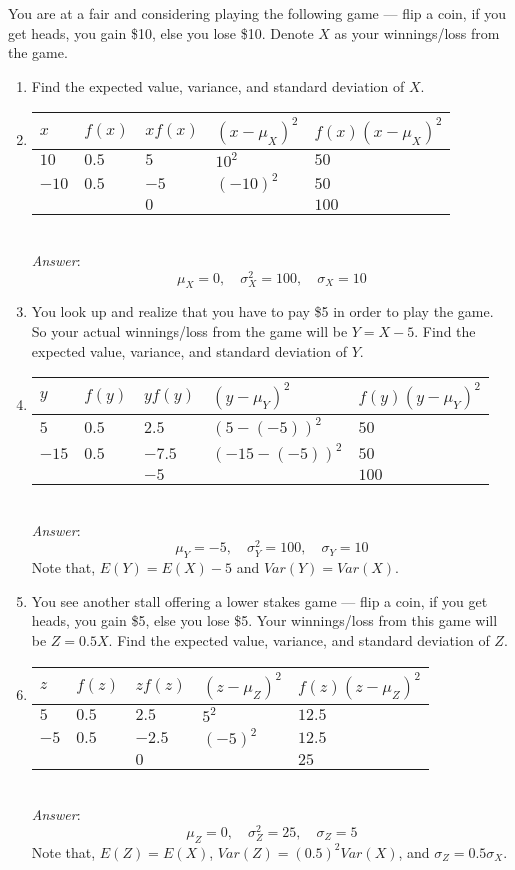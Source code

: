 \documentclass{./../../Latex/handout}
\begin{document}
You are at a fair and considering playing the following game --- flip a coin, if you get heads, you gain \$10, else you lose \$10. Denote $X$ as your winnings/loss from the game.
  \begin{enumerate}

\item Find the expected value, variance, and standard deviation of $X$. 
\item[] \begin{tabularx}{0.8\textwidth}{P{2cm}P{1cm}YYY}
\toprule
$x$ & $f(x)$ & $x f(x)$ & $(x-\mu_X)^2$ & $f(x)(x-\mu_X)^2$ \\ \midrule
$10$ & $0.5$ & $5$ & $10^2$ & $50$ \\
$-10$ & $0.5$ & $-5$ & $(-10)^2$ & $50$ \\ \midrule
 & & $0$ & & $100$ \\ \bottomrule
\end{tabularx} \\

\textit{Answer}:
$$ \mu_X = 0, \quad \sigma^2_X = 100, \quad \sigma_X = 10$$

\newpage
\item You look up and realize that you have to pay \$5 in order to play the game. So your actual winnings/loss from the game will be $Y=X-5$. Find the expected value, variance, and standard deviation of $Y$. 
\item[] \begin{tabularx}{0.8\textwidth}{P{2cm}P{1cm}YYY}
\toprule
$y$ & $f(y)$ & $y f(y)$ & $(y-\mu_Y)^2$ & $f(y)(y-\mu_Y)^2$ \\ \midrule
$5$ & $0.5$ & $2.5$ & $(5-(-5))^2$ & $50$ \\
$-15$ & $0.5$ & $-7.5$ & $(-15-(-5))^2$ & $50$ \\ \midrule
 & & $-5$ & & $100$ \\ \bottomrule
\end{tabularx} \\

\textit{Answer}:
$$ \mu_Y = -5, \quad \sigma^2_Y = 100, \quad \sigma_Y = 10$$   
Note that, $E(Y) = E(X)-5$ and $Var(Y) = Var(X)$. \\


\item You see another stall offering a lower stakes game --- flip a coin, if you get heads, you gain \$5, else you lose \$5. Your winnings/loss from this game will be $Z=0.5X$. Find the expected value, variance, and standard deviation of $Z$. 
\item[] \begin{tabularx}{0.8\textwidth}{P{2cm}P{1cm}YYY}
\toprule
$z$ & $f(z)$ & $z f(z)$ & $(z-\mu_Z)^2$ & $f(z)(z-\mu_Z)^2$ \\ \midrule
$5$ & $0.5$ & $2.5$ & $5^2$ & $12.5$ \\
$-5$ & $0.5$ & $-2.5$ & $(-5)^2$ & $12.5$ \\ \midrule
 & & $0$ & & $25$ \\ \bottomrule
\end{tabularx} \\

\textit{Answer}:
$$ \mu_Z = 0, \quad \sigma^2_Z = 25, \quad \sigma_Z = 5$$
Note that, $E(Z) = E(X)$, $Var(Z) = (0.5)^2 Var(X)$, and $\sigma_Z=0.5 \sigma_X$. \\

  \end{enumerate}
\end{document}
